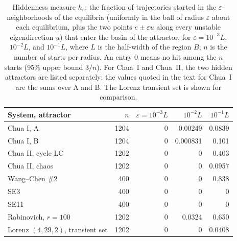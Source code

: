 
\begin{table}
\caption{Hiddenness measure $h_\varepsilon$: the fraction of trajectories started in the $\varepsilon$-neighborhoods of the equilibria (uniformly in the ball of radius $\varepsilon$ about each equilibrium, plus the two points $e\pm\varepsilon u$ along every unstable eigendirection $u$) that enter the basin of the attractor, for $\varepsilon=10^{-3}L$, $10^{-2}L$, and $10^{-1}L$, where $L$ is the half-width of the region $B$; $n$ is the number of starts per radius. An entry 0 means no hit among the $n$ starts (95\% upper bound $3/n$). For Chua~I and Chua~II, the two hidden attractors are listed separately; the values quoted in the text for Chua~I are the sums over A and B. The Lorenz transient set is shown for comparison.}
\label{tab:hidden}
\footnotesize
\begin{ruledtabular}
\begin{tabular}{lrrrr}
System, attractor & $n$ & $\varepsilon=10^{-3}L$ & $10^{-2}L$ & $10^{-1}L$ \\
\hline
Chua I, A & 1204 & 0 & 0.00249 & 0.0839 \\
Chua I, B & 1204 & 0 & 0.000831 & 0.101 \\
Chua II, cycle LC & 1202 & 0 & 0 & 0.403 \\
Chua II, chaos & 1202 & 0 & 0 & 0.0957 \\
Wang--Chen \#2 & 400 & 0 & 0 & 0.838 \\
SE3 & 400 & 0 & 0 & 0 \\
SE11 & 400 & 0 & 0 & 0 \\
Rabinovich, $r=100$ & 1202 & 0 & 0.0324 & 0.650 \\
Lorenz $(4,29,2)$, transient set & 1202 & 0 & 0 & 0.0408 \\
\end{tabular}
\end{ruledtabular}
\end{table}
